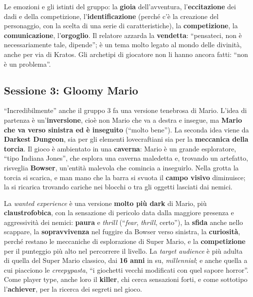 Le emozioni e gli istinti del gruppo: la \textbf{gioia} dell'avventura,
l'\textbf{eccitazione} dei dadi e della competizione,
l'\textbf{identificazione} (perché c'è la creazione del personaggio, con la scelta
di una serie di caratteristiche), la \textbf{competizione}, la
\textbf{comunicazione}, l'\textbf{orgoglio}. Il relatore azzarda la
\textbf{vendetta}: ``pensateci, non è necessariamente tale, dipende''; è un tema
molto legato al mondo delle divinità, anche per via di Kratos. Gli archetipi di
giocatore non li hanno ancora fatti: ``non è un problema''.

\subsection{Sessione 3: Gloomy Mario}

``Incredibilmente'' anche il gruppo 3 fa una versione tenebrosa di Mario. L'idea
di partenza è un'\textbf{inversione}, cioè non Mario che va a destra e insegue, ma
\textbf{Mario che va verso sinistra ed è inseguito} (``molto bene''). La seconda
idea viene da \textbf{Darkest Dungeon}, sia per gli elementi lovecraftiani sia per
la \textbf{meccanica della torcia}. Il gioco è ambientato in una
\textbf{caverna}: Mario è un grande esploratore, ``tipo Indiana Jones'', che
esplora una caverna maledetta e, trovando un artefatto, risveglia
\textbf{Bowser}, un'entità malevola che comincia a inseguirlo. Nella grotta la
torcia si scarica, e man mano che la barra si svuota il \textbf{campo visivo}
diminuisce; la si ricarica trovando cariche nei blocchi o tra gli oggetti lasciati
dai nemici.

La \emph{wanted experience} è una versione \textbf{molto più dark} di Mario, più
\textbf{claustrofobica}, con la sensazione di pericolo data dalla maggiore presenza
e aggressività dei nemici: \textbf{paura} e \emph{thrill} (``\emph{fear},
\emph{thrill}, certo''), la \textbf{sfida} anche nello scappare, la
\textbf{sopravvivenza} nel fuggire da Bowser verso sinistra, la
\textbf{curiosità}, perché restano le meccaniche di esplorazione di Super Mario, e
la \textbf{competizione} per il punteggio più alto nel percorrere il livello. La
\emph{target audience} è più adulta di quella del Super Mario classico, dai
\textbf{16 anni} in su, \emph{millennial}; e anche quella a cui piacciono le
\emph{creepypasta}, ``i giochetti vecchi modificati con quel sapore horror''. Come
player type, anche loro il \textbf{killer}, chi cerca sensazioni forti, e come
sottotipo l'\textbf{achiever}, per la ricerca dei segreti nel gioco.

